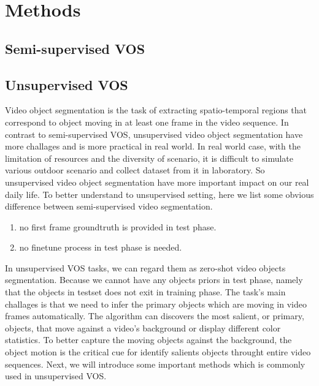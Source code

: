 \section{Methods}

\subsection{Semi-supervised VOS}





\subsection{Unsupervised VOS}
Video object segmentation is the task of extracting spatio-temporal regions that correspond to object moving in at
least one frame in the video sequence. In contrast to semi-supervised VOS, unsupervised video object segmentation have 
more challages and is more practical in real world. In real world case, with the limitation of resources and the diversity of scenario,
it is difficult to simulate various outdoor scenario and collect dataset from it in laboratory. So unsupervised video object 
segmentation have more important impact on our real daily life. To better understand to unsupervised setting, here we list some
obvious difference between semi-supervised video segmentation.
\begin{enumerate}
    \item no first frame groundtruth is provided in test phase.
    \item no finetune process in test phase is needed.
\end{enumerate}

In unsupervised VOS tasks, we can regard them as zero-shot video objects segmentation. Because we cannot have any objects priors
in test phase, namely that the objects in testset does not exit in training phase. The task's main challages is that we need to infer
the primary objects which are moving in video frames automatically. The algorithm can discovers the most salient, or primary, objects,
that move against a video's background or display different color statistics. To better capture the moving objects against the background,
the object motion is the critical cue for identify salients objects throught entire video sequences. Next, we will introduce some important
methods which is commonly used in unsupervised VOS.

